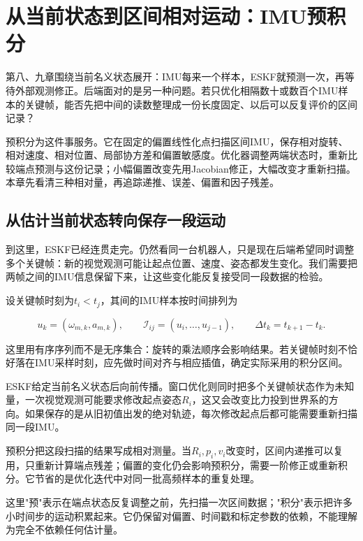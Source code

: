 \chapter{从当前状态到区间相对运动：IMU预积分}

\label{chap:md-10}

第八、九章围绕当前名义状态展开：IMU每来一个样本，ESKF就预测一次，再等待外部观测修正。后端面对的是另一种问题。若只优化相隔数十或数百个IMU样本的关键帧，能否先把中间的读数整理成一份长度固定、以后可以反复评价的区间记录？

预积分为这件事服务。它在固定的偏置线性化点扫描区间IMU，保存相对旋转、相对速度、相对位置、局部协方差和偏置敏感度。优化器调整两端状态时，重新比较端点预测与这份记录；小幅偏置改变先用Jacobian修正，大幅改变才重新扫描。本章先看清三种相对量，再追踪递推、误差、偏置和因子残差。

\section{从估计当前状态转向保存一段运动}

到这里，ESKF已经连贯走完。仍然看同一台机器人，只是现在后端希望同时调整多个关键帧：新的视觉观测可能让起点位置、速度、姿态都发生变化。我们需要把两帧之间的IMU信息保留下来，让这些变化能反复接受同一段数据的检验。

设关键帧时刻为$t_i<t_j$，其间的IMU样本按时间排列为

\begin{equation*}
u_k=(\omega_{m,k},a_{m,k}),\qquad
 \mathcal I_{ij}=(u_i,\ldots,u_{j-1}),\qquad
 \Delta t_k=t_{k+1}-t_k.
\end{equation*}

这里用有序序列而不是无序集合：旋转的乘法顺序会影响结果。若关键帧时刻不恰好落在IMU采样时刻，应先做时间对齐与相应插值，确定实际采用的积分区间。

ESKF给定当前名义状态后向前传播。窗口优化则同时把多个关键帧状态作为未知量，一次视觉观测可能要求修改起点姿态$R_i$，这又会改变比力投到世界系的方向。如果保存的是从旧初值出发的绝对轨迹，每次修改起点后都可能需要重新扫描同一段IMU。

预积分把这段扫描的结果写成相对测量。当$R_i,p_i,v_i$改变时，区间内递推可以复用，只重新计算端点残差；偏置的变化仍会影响预积分，需要一阶修正或重新积分。它节省的是优化迭代中对同一批高频样本的重复处理。

这里"预"表示在端点状态反复调整之前，先扫描一次区间数据；"积分"表示把许多小时间步的运动积累起来。它仍保留对偏置、时间戳和标定参数的依赖，不能理解为完全不依赖任何估计量。


